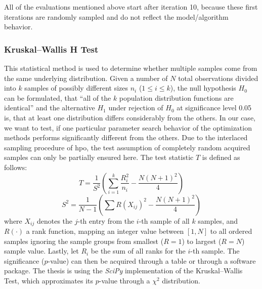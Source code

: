 All of the evaluations mentioned above start after iteration 10, because these first iterations are randomly sampled and do not reflect the model/algorithm behavior.

\subsubsection{Kruskal–Wallis H Test}
This statistical method is used to determine whether multiple samples come from the same underlying distribution. Given a number of $N$ total observations divided into $k$ samples of possibly different sizes $n_i$ ($1 \leq i \leq k$), the null hypothesis $H_0$ can be formulated, that \enquote{all of the $k$ population distribution functions are identical} \cite{conover1999practical} and the alternative $H_1$ under rejection of $H_0$ at significance level 0.05 is, that at least one distribution differs considerably from the others. In our case, we want to test, if one particular parameter search behavior of the optimization methods performs significantly different from the others. Due to the interlaced sampling procedure of \gls{hpo}, the test assumption of completely random acquired samples can only be partially ensured here. The test statistic $T$ is defined as follows:
\begin{equation}
	T = \frac{1}{S^2} \left(  \sum_{i=1}^{k} \frac{R_i^2}{n_i} - \frac{N(N+1)^2}{4}  \right) 
\end{equation}
\begin{equation*}
	S^2 = \frac{1}{N-1} \left(  \sum R(X_{ij})^2 - \frac{N(N+1)^2}{4}  \right) 
\end{equation*}
where $X_{ij}$ denotes the $j$-th entry from the $i$-th sample of all $k$ samples, and $R(\cdot)$ a rank function, mapping an integer value between $\left[ 1,N\right] $ to all ordered samples ignoring the sample groups from smallest ($R = 1$) to largest ($R = N$) sample value. Lastly, let $R_i$ be the sum of all ranks for the $i$-th sample. The significance ($p$-value) can then be acquired through a table or through a software package. The thesis is using the \textit{SciPy} implementation of the Kruskal–Wallis Test, which approximates its $p$-value through a $\chi^2$ distribution.

